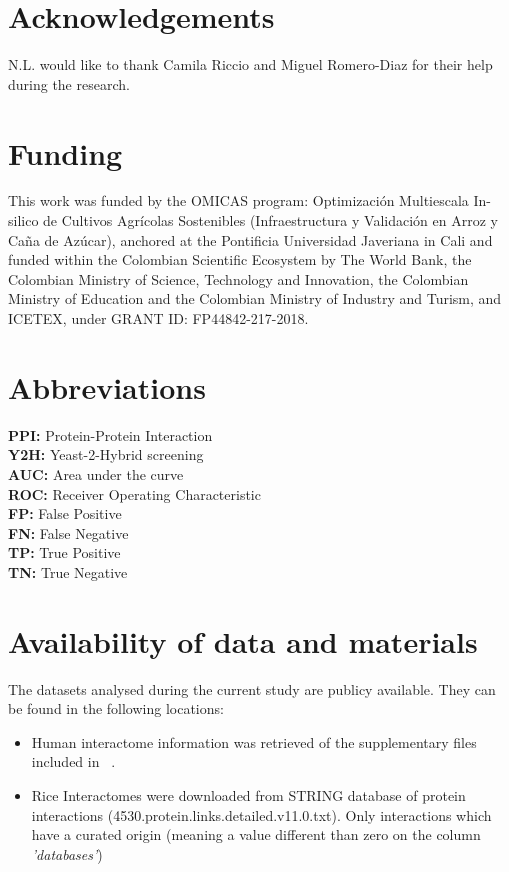 \section*{Acknowledgements}%
N.L. would like to thank Camila Riccio and Miguel Romero-Diaz for their help 
during the research.


\section*{Funding}%
This work was funded by the OMICAS program: Optimización Multiescala In-silico de
Cultivos Agrícolas Sostenibles (Infraestructura y Validación en Arroz y Caña de Azúcar),
anchored at the Pontificia Universidad Javeriana in Cali and funded within the Colombian
Scientific Ecosystem by The World Bank, the Colombian Ministry of Science, Technology and
Innovation, the Colombian Ministry of Education and the Colombian Ministry of Industry 
and Turism, and ICETEX, under GRANT ID: FP44842-217-2018.

\section*{Abbreviations}%
\textbf{PPI:} Protein-Protein Interaction\\
\textbf{Y2H:} Yeast-2-Hybrid screening\\
\textbf{AUC:} Area under the curve\\
\textbf{ROC:} Receiver Operating Characteristic\\
\textbf{FP:} False Positive\\
\textbf{FN:} False Negative\\
\textbf{TP:} True Positive\\
\textbf{TN:} True Negative

\section*{Availability of data and materials}%
The datasets analysed during the current study are publicy available. They can be found in the following locations:
\begin{itemize}
\item Human interactome information was retrieved of the supplementary files included in ~\cite{Kovacs2019}.
\item Rice Interactomes were downloaded from STRING database of protein interactions (4530.protein.links.detailed.v11.0.txt).
Only interactions which have a curated origin (meaning a value different than zero on the column \emph{'databases'})
\end{itemize}

